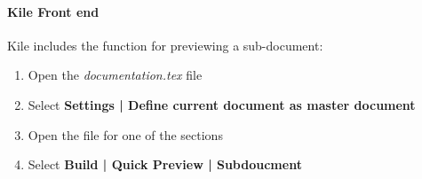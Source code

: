 \paragraph{Kile  Front end }
Kile includes the function for previewing a sub-document:
\begin{enumerate}
   \item Open the \textit{documentation.tex} file
   \item Select \textbf{Settings | Define current document as master document}
   \item Open the file for one of the sections
   \item Select \textbf{Build | Quick Preview | Subdoucment }
\end{enumerate}

%
%
%
%
%
%

